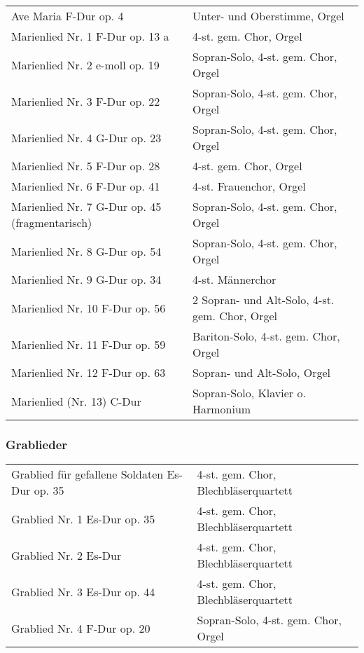 \documentclass{book}
\begin{document}
\begin{tabular}{ll}
Ave Maria F-Dur op. 4 &
Unter- und Oberstimme, Orgel\\

Marienlied Nr. 1 F-Dur op. 13 a &
4-st. gem. Chor, Orgel\\

Marienlied Nr. 2 e-moll op. 19 &
Sopran-Solo, 4-st. gem. Chor, Orgel\\

Marienlied Nr. 3 F-Dur op. 22 &
Sopran-Solo, 4-st. gem. Chor, Orgel\\

Marienlied Nr. 4 G-Dur op. 23 &
Sopran-Solo, 4-st. gem. Chor, Orgel\\

Marienlied Nr. 5 F-Dur op. 28 &
4-st. gem. Chor, Orgel\\

Marienlied Nr. 6 F-Dur op. 41 &
4-st. Frauenchor, Orgel\\

Marienlied Nr. 7 G-Dur op. 45 (fragmentarisch) &
Sopran-Solo, 4-st. gem. Chor, Orgel\\

Marienlied Nr. 8 G-Dur op. 54 &
Sopran-Solo, 4-st. gem. Chor, Orgel\\

Marienlied Nr. 9 G-Dur op. 34 &
4-st. Männerchor\\

Marienlied Nr. 10 F-Dur op. 56 &
2 Sopran- und Alt-Solo, 4-st. gem. Chor, Orgel\\

Marienlied Nr. 11 F-Dur op. 59 &
Bariton-Solo, 4-st. gem. Chor, Orgel\\

Marienlied Nr. 12 F-Dur op. 63 &
Sopran- und Alt-Solo, Orgel\\

Marienlied (Nr. 13) C-Dur &
Sopran-Solo, Klavier o. Harmonium\\
\end{tabular}

\subsubsection{Grablieder}

\begin{tabular}{ll}
Grablied für gefallene Soldaten Es-Dur op. 35 &
4-st. gem. Chor, Blechbläserquartett\\

Grablied Nr. 1 Es-Dur op. 35 &
4-st. gem. Chor, Blechbläserquartett\\

Grablied Nr. 2 Es-Dur &
4-st. gem. Chor, Blechbläserquartett\\

Grablied Nr. 3 Es-Dur op. 44 &
4-st. gem. Chor, Blechbläserquartett\\

Grablied Nr. 4 F-Dur op. 20 &
Sopran-Solo, 4-st. gem. Chor, Orgel\\
\end{tabular}
\end{document}

